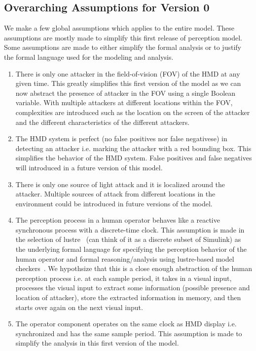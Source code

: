 \subsection{Overarching Assumptions for Version 0}

We make a few global assumptions which applies to the entire model. 
These assumptions are mostly made to simplify this first release of perception model. 
Some assumptions are made to either simplify the formal analysis or to justify the formal language used for the modeling and analysis. 

\begin{enumerate}
    \item There is only one attacker in the field-of-vision (FOV) of the HMD at any given time. This greatly simplifies this first version of the model as we can now 
    abstract the presence of attacker in the FOV using a single Boolean variable.  With multiple attackers at different locations within the FOV, complexities are introduced 
    such as the location on the screen of the attacker and the different characteristics of the different attackers.
    \item The HMD system is perfect (no false positives nor false negativese) in detecting an attacker i.e. marking the attacker with a red bounding box. 
    This simplifies the behavior of the HMD system.  False positives and false negatives will introduced in a future version of this model.  
    \item There is only one source of light attack and it is localized around the attacker. Multiple sources of attack from different locations in the environment could 
    be introduced in future versions of the model. 
    \item The perception process in a human operator behaves like a reactive synchronous\cite{halbwachs1991synchronous} process with a discrete-time clock. This assumption is made 
    in the selection of lustre~\cite{halbwachs2012synchronous} (can think of it as a discrete subset of Simulink) 
    as the underlying formal language for specifying the perception behavior of the human operator and formal reasoning/analysis using 
    lustre-based model checkers~\cite{champion2016kind,gacek2018jk}. We hypothsize that this is a close enough abstraction of the human perception process 
    i.e. at each sample period, it takes in a visual input, processes the visual input to extract some information (possible presence and location of attacker), store the extracted 
    information in memory, and then starts over again on the next visual input.   
    \item The operator component operates on the same clock as HMD display i.e. synchronized and has the same sample period. This assumption is made to simplify the analysis in this 
    first version of the model.     
\end{enumerate}


